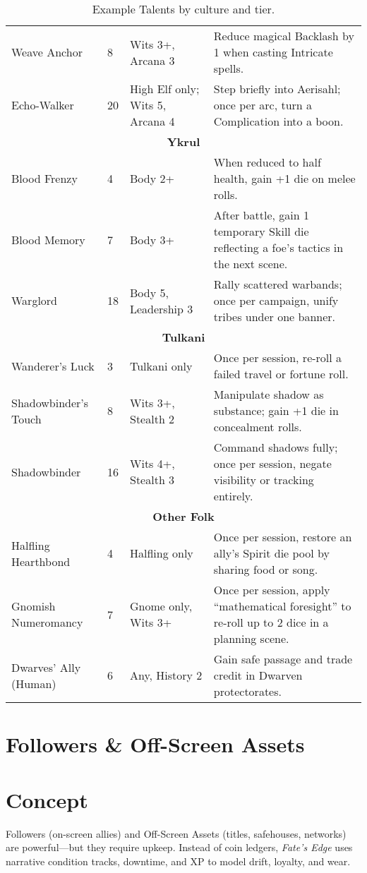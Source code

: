 \documentclass[12pt]{article}
\begin{document}
\begin{table}[h]
\begin{tabular}{|p{3cm}|p{2cm}|p{3cm}|p{6cm}|}
Weave Anchor & 8 & Wits 3+, Arcana 3 & Reduce magical Backlash by 1 when casting Intricate spells. \\
Echo-Walker & 20 & High Elf only; Wits 5, Arcana 4 & Step briefly into Aerisahl; once per arc, turn a Complication into a boon. \\
\hline
\multicolumn{4}{|c|}{\textbf{Ykrul}} \\
\hline
Blood Frenzy & 4 & Body 2+ & When reduced to half health, gain +1 die on melee rolls. \\
Blood Memory & 7 & Body 3+ & After battle, gain 1 temporary Skill die reflecting a foe’s tactics in the next scene. \\
Warglord & 18 & Body 5, Leadership 3 & Rally scattered warbands; once per campaign, unify tribes under one banner. \\
\hline
\multicolumn{4}{|c|}{\textbf{Tulkani}} \\
\hline
Wanderer’s Luck & 3 & Tulkani only & Once per session, re-roll a failed travel or fortune roll. \\
Shadowbinder’s Touch & 8 & Wits 3+, Stealth 2 & Manipulate shadow as substance; gain +1 die in concealment rolls. \\
Shadowbinder & 16 & Wits 4+, Stealth 3 & Command shadows fully; once per session, negate visibility or tracking entirely. \\
\hline
\multicolumn{4}{|c|}{\textbf{Other Folk}} \\
\hline
Halfling Hearthbond & 4 & Halfling only & Once per session, restore an ally’s Spirit die pool by sharing food or song. \\
Gnomish Numeromancy & 7 & Gnome only, Wits 3+ & Once per session, apply “mathematical foresight” to re-roll up to 2 dice in a planning scene. \\
Dwarves’ Ally (Human) & 6 & Any, History 2 & Gain safe passage and trade credit in Dwarven protectorates. \\
\hline
\end{tabular}
\caption{Example Talents by culture and tier.}
\end{table}

\section{Followers \& Off-Screen Assets}
\label{chap:followers-assets}

\section{Concept}
Followers (on-screen allies) and Off-Screen Assets (titles, safehouses, networks) are powerful—but they require upkeep. Instead of coin ledgers, \emph{Fate’s Edge} uses narrative condition tracks, downtime, and XP to model drift, loyalty, and wear.
\end{document}
